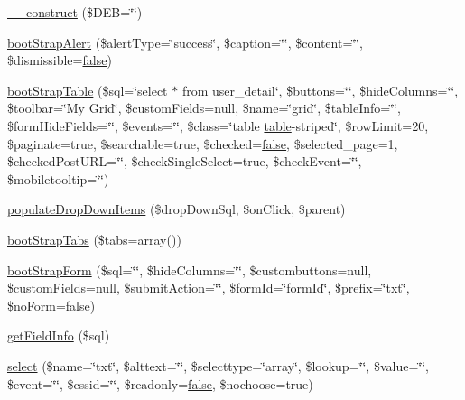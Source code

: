 \begin{DoxyCompactItemize}
\item 
\hyperlink{classCody_a55a918acdc624ced30d76711856475aa}{\+\_\+\+\_\+construct} (\$D\+E\+B=\char`\"{}\char`\"{})
\item 
\hyperlink{classCody_af81e612dbfec3bb1e5b205da1fa2e1db}{boot\+Strap\+Alert} (\$alert\+Type=\char`\"{}success\char`\"{}, \$caption=\char`\"{}\char`\"{}, \$content=\char`\"{}\char`\"{}, \$dismissible=\hyperlink{tina4_8php_aec2deb5590a84bee262c3bea206ae88f}{false})
\item 
\hyperlink{classCody_ae6b08ef724d6aa5cd04281ddbc9a9301}{boot\+Strap\+Table} (\$sql=\char`\"{}select $\ast$ from user\+\_\+detail\char`\"{}, \$buttons=\char`\"{}\char`\"{}, \$hide\+Columns=\char`\"{}\char`\"{}, \$toolbar=\char`\"{}My Grid\char`\"{}, \$custom\+Fields=null, \$name=\char`\"{}grid\char`\"{}, \$table\+Info=\char`\"{}\char`\"{}, \$form\+Hide\+Fields=\char`\"{}\char`\"{}, \$events=\char`\"{}\char`\"{}, \$class=\char`\"{}table \hyperlink{Shape_8php_a5aa7b43c8ec77df216a71a27da0a321c}{table}-\/striped\char`\"{}, \$row\+Limit=20, \$paginate=true, \$searchable=true, \$checked=\hyperlink{tina4_8php_aec2deb5590a84bee262c3bea206ae88f}{false}, \$selected\+\_\+page=1, \$checked\+Post\+U\+R\+L=\char`\"{}\char`\"{}, \$check\+Single\+Select=true, \$check\+Event=\char`\"{}\char`\"{}, \$mobiletooltip=\char`\"{}\char`\"{})
\item 
\hyperlink{classCody_ade934190b62559aae3d784f7681253af}{populate\+Drop\+Down\+Items} (\$drop\+Down\+Sql, \$on\+Click, \$parent)
\item 
\hyperlink{classCody_a91baebb215438e27a00b211a2e352b14}{boot\+Strap\+Tabs} (\$tabs=array())
\item 
\hyperlink{classCody_a261dc6613ef1c8fa40bf4332aebaa5c0}{boot\+Strap\+Form} (\$sql=\char`\"{}\char`\"{}, \$hide\+Columns=\char`\"{}\char`\"{}, \$custombuttons=null, \$custom\+Fields=null, \$submit\+Action=\char`\"{}\char`\"{}, \$form\+Id=\char`\"{}form\+Id\char`\"{}, \$prefix=\char`\"{}txt\char`\"{}, \$no\+Form=\hyperlink{tina4_8php_aec2deb5590a84bee262c3bea206ae88f}{false})
\item 
\hyperlink{classCody_a9190879d7bba88107875e2fe4723804c}{get\+Field\+Info} (\$sql)
\item 
\hyperlink{classCody_a11ec72bcb8aa970fd04b058bd3612cd0}{select} (\$name=\char`\"{}txt\char`\"{}, \$alttext=\char`\"{}\char`\"{}, \$selecttype=\char`\"{}array\char`\"{}, \$lookup=\char`\"{}\char`\"{}, \$value=\char`\"{}\char`\"{}, \$event=\char`\"{}\char`\"{}, \$cssid=\char`\"{}\char`\"{}, \$readonly=\hyperlink{tina4_8php_aec2deb5590a84bee262c3bea206ae88f}{false}, \$nochoose=true)

\end{DoxyCompactItemize}
